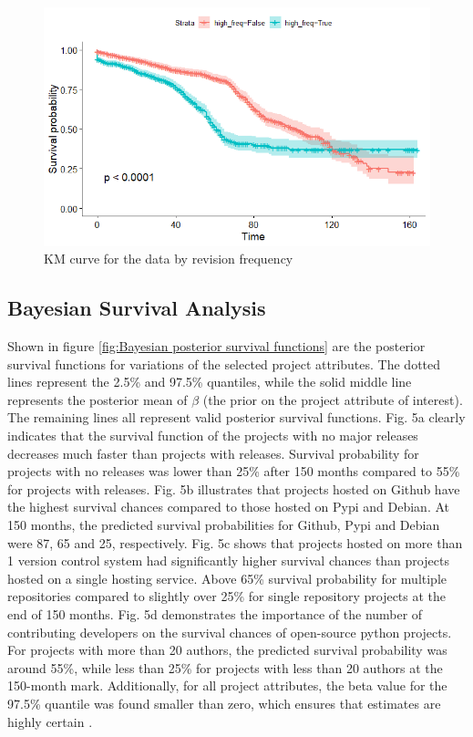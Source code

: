 \documentclass[acmconf]{acmart}
\begin{document}
\begin{figure}[H]
    \centering
    \includegraphics[scale=0.75]{commit_freq.png}
    \caption{KM curve for the data by revision frequency }
    \label{fig:freq}
\end{figure}

\subsection{Bayesian Survival Analysis}

Shown in figure \ref{fig:Bayesian posterior survival functions} are the posterior survival functions for variations of the selected project attributes. The dotted lines represent the  2.5\% and 97.5\% quantiles, while the solid middle line represents the posterior mean of $\beta$ (the prior on the project attribute of interest). The remaining lines all represent valid posterior survival functions. 
Fig. 5a clearly indicates that the survival function of the projects with no major releases decreases much faster than projects with releases. 
Survival probability for projects with no releases was lower than 25\% after 150 months compared to 55\% for projects with releases.
Fig. 5b illustrates that projects hosted on Github have the highest survival chances compared to those hosted on Pypi and Debian. 
At 150 months, the predicted survival probabilities for Github, Pypi and Debian were 87, 65 and 25, respectively.
Fig. 5c shows that projects hosted on more than 1 version control system had significantly higher survival chances than projects hosted on a single hosting service. 
Above 65\% survival probability for multiple repositories compared to slightly over 25\% for single repository projects at the end of 150 months.
Fig. 5d demonstrates the importance of the number of contributing developers on the survival chances of open-source python projects. 
For projects with more than 20 authors, the predicted survival probability was around 55\%, while less than 25\% for projects with less than 20 authors at the 150-month mark.
Additionally, for all project attributes, the beta value for the 97.5\% quantile was found smaller than zero, which ensures that estimates are highly certain \cite{kelter2020bayesian}.
\end{document}
